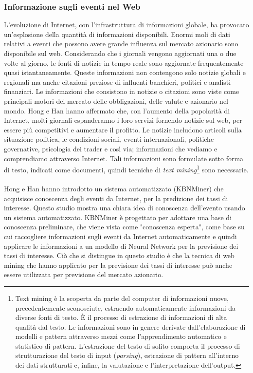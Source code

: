 \documentclass[a4paper,12pt]{report}
\begin{document}
\subsubsection{Informazione sugli eventi nel Web}
L'evoluzione di Internet, con l'infrastruttura di informazioni globale, ha provocato un'esplosione della quantità di informazioni disponibili. Enormi moli di dati relativi a eventi che possono avere grande influenza sul mercato azionario sono disponibile sul web. Considerando che i giornali vengono aggiornati una o due volte al giorno, le fonti di notizie in tempo reale sono aggiornate frequentemente quasi istantaneamente. Queste informazioni non contengono solo notizie globali e regionali ma anche citazioni preziose di influenti banchieri, politici e analisti finanziari. Le informazioni che consistono in notizie o citazioni sono viste come principali motori del mercato delle obbligazioni, delle valute e azionario nel mondo. Hong e Han \cite{13} hanno affermato che, con l'aumento della popolarità di Internet, molti giornali espanderanno i loro servizi fornendo notizie sul web, per essere più competitivi e aumentare il profitto. Le notizie includono articoli sulla situazione politica, le condizioni sociali, eventi internazionali, politiche governative, psicologia dei trader e così via; informazioni che vediamo e comprendiamo attraverso Internet. Tali informazioni sono formulate sotto forma di testo, indicati come documenti, quindi tecniche di \textit{text mining}\footnote{Text mining è la scoperta da parte del computer di informazioni nuove, precedentemente sconosciute, estraendo automaticamente informazioni da diverse fonti di testo.	È il processo di estrazione di informazioni di alta qualità dal testo. Le informazioni sono in genere derivate dall'elaborazione di modelli e pattern attraverso mezzi come l'apprendimento automatico e statistico di pattern. L'estrazione del testo di solito comporta il processo di strutturazione del testo di input (\textit{parsing}), estrazione di pattern all'interno dei dati strutturati e, infine, la valutazione e l'interpretazione dell'output.} sono necessarie.\\~\\
Hong e Han \cite{13} hanno introdotto un sistema automatizzato (KBNMiner) che acquisisce conoscenza degli eventi da Internet, per la predizione dei tassi di interesse. Questo studio
mostra una chiara idea di conoscenza dell'evento usando un sistema automatizzato. KBNMiner è progettato per adottare una base di conoscenza preliminare, che viene vista come "conoscenza esperta", come base su cui raccogliere informazioni sugli eventi da Internet automaticamente e quindi applicare le informazioni a un modello di Neural Network per la previsione dei tassi di interesse. Ciò che si distingue in questo studio è che la tecnica di web mining che hanno applicato per la previsione dei tassi di interesse può anche essere utilizzata per previsione del mercato azionario.
\end{document}
